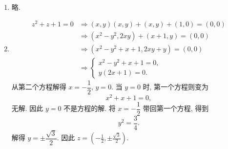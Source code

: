 \begin{enumerate}[(1)]
\begin{proof}
\begin{gather*}
                i(-y) = (0,1)(-y,0) = (0,-y). \qedhere
            \end{gather*}
        \end{proof}
    \item %
        略.
    \item %
        \begin{align*}
            z^2+z+1=0 &\Rightarrow (x,y)(x,y) + (x,y) + (1,0) = (0,0) \\
            &\Rightarrow (x^2-y^2,2xy) + (x+1,y) = (0,0) \\
            &\Rightarrow (x^2-y^2+x+1,2xy+y) = (0,0) \\
            &\Rightarrow
            \begin{cases}
                x^2-y^2+x+1 = 0, \\
                y(2x+1) = 0.
            \end{cases}
        \end{align*}
        从第二个方程解得 $x=-\dfrac12$, $y=0$. 当 $y=0$ 时, 第一个方程则变为
        \[
            x^2+x+1 = 0,    
        \]
        无解. 因此 $y=0$ 不是方程的解. 将 $x=-\dfrac12$ 带回第一个方程, 得到
        \[
            y^2 = \frac{3}{4}.    
        \]
        解得 $y = \pm\dfrac{\sqrt{3}}{2}$. 因此 $z=\displaystyle{\left(-\frac12,\pm\frac{\sqrt{3}}{2}\right)}$.
\end{enumerate}
% 
